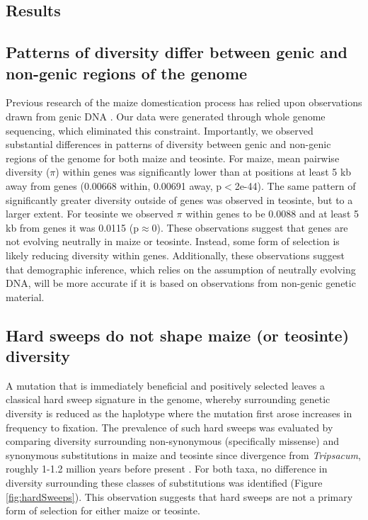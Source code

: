 \documentclass{pnastwo}
\begin{document}
\begin{article}
\section{Results}
\subsection{Patterns of diversity differ between genic and
  non-genic regions of the genome}
Previous research of the maize domestication process has relied upon
observations drawn from genic DNA \cite{wright2005,wang1999,eyre1998}. Our data were generated through whole genome sequencing,
which eliminated this constraint. Importantly, we observed substantial
differences in patterns of diversity between genic and non-genic regions
of the genome for both maize and teosinte. For maize, mean pairwise
diversity ($\pi$) within genes was significantly lower than at
positions at least 5 kb away from genes (0.00668 within, 0.00691 away, p$<$2e-44). The same
pattern of significantly greater diversity outside of genes was observed in
teosinte, but to a larger extent. For teosinte we observed $\pi$
within genes to be 0.0088 and at least 5 kb from genes it was 0.0115
(p$\approx$0). These observations suggest that genes are not evolving
neutrally in maize or teosinte. Instead, some form of selection is likely
reducing diversity within genes. Additionally, these observations
suggest that demographic inference, which relies on the assumption of
neutrally evolving DNA, will be more accurate if it is based on
observations from non-genic genetic material.

\subsection{Hard sweeps do not shape maize (or teosinte) diversity}
A mutation that is immediately beneficial and positively selected leaves a classical hard
sweep signature in the genome, whereby surrounding genetic diversity
is reduced as the haplotype where the mutation first
arose increases in frequency to fixation. The prevalence of such hard
sweeps was evaluated by comparing diversity
surrounding non-synonymous (specifically missense) and synonymous substitutions in maize and
teosinte since divergence from \emph{Tripsacum}, roughly 1-1.2 million years before
present \cite{ross2009}. For both taxa, no difference in diversity
surrounding these classes of substitutions was identified (Figure
\ref{fig:hardSweeps}). This observation suggests that hard sweeps are not a primary form of
selection for either maize or teosinte.


\end{article}
\end{document}
